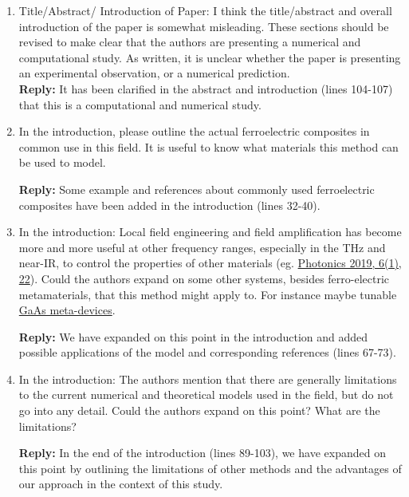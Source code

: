 \documentclass[%
 aip,
 amsmath,amssymb,
 reprint,%
]{revtex4-1}
\newcommand{\rep}[1]{\textcolor{reply}{{\bfseries Reply:} #1}}
\begin{document}
\begin{enumerate}
\item Title/Abstract/ Introduction of Paper: I think the title/abstract and overall introduction of the
 paper is somewhat misleading. These sections should be revised to make clear that the authors are
  presenting a numerical and computational study. As written, it is unclear whether the paper is presenting
   an experimental observation, or a numerical prediction.\\


\rep{It has been clarified in the abstract and introduction (lines 104-107) that this is a computational and numerical study.}



\item In the introduction, please outline the actual ferroelectric composites in common use in this field.
 It is useful to know what materials this method can be used to model.

\rep{Some example and references about commonly used ferroelectric composites have been
added in the introduction (lines 32-40).}



\item In the introduction: Local field engineering and field amplification has become more and more useful
 at other frequency ranges, especially in the THz and near-IR, to control the properties of other materials
  (eg. \href{https://doi.org/10.3390/photonics6010022}{Photonics 2019, 6(1), 22}). Could the authors expand
   on some other systems, besides ferro-electric metamaterials, that this method might apply to. For
    instance maybe tunable
    \href{https://journals.aps.org/prl/abstract/10.1103/PhysRevLett.110.217404}{GaAs meta-devices}.

    \rep{We have expanded on this point in the introduction and added possible applications of the model and corresponding references (lines 67-73).}


\item In the introduction: The authors mention that there are generally limitations to the current
 numerical and theoretical models used in the field, but do not go into any detail. Could the authors
  expand on this point? What are the limitations?

  \rep{In the end of the introduction (lines 89-103), we have expanded on this point by outlining the limitations of other methods and
  the advantages of our approach in the context of this study.}




\end{enumerate}
\end{document}
